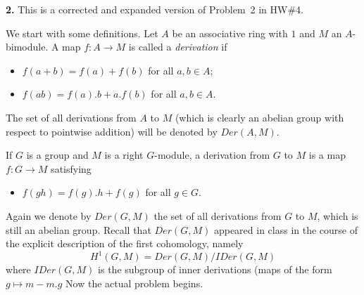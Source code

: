 \documentclass[12pt]{amsart}
\begin{document}
{\bf 2.} This is a corrected and expanded version of Problem~2 in HW\#4. 

We start with some definitions. Let $A$ be an associative ring with $1$ and $M$ an $A$-bimodule. A map $f:A\to M$ is called a {\it derivation} if
\begin{itemize}  
\item[(1)] $f(a+b)=f(a)+f(b)$ for all $a,b\in A$;
\item[(2)] $f(ab)=f(a).b+a.f(b)$ for all $a,b\in A$.
\end{itemize}
The set of all derivations from $A$ to $M$ (which is clearly an abelian group with respect to pointwise addition) will be denoted
by $Der(A,M)$.

If $G$ is a group and $M$ is a right $G$-module, a derivation from $G$ to $M$ is a map $f:G\to M$ satisfying 
\begin{itemize}  
\item[(3)] $f(gh)=f(g).h+f(g)$ for all $g\in G$.
\end{itemize}
Again we denote by $Der(G,M)$ the set of all derivations from $G$ to $M$, which is still an abelian group. 
Recall that $Der(G,M)$ appeared in class in the course of the explicit description of the first cohomology,
namely $$H^1(G,M)= Der(G,M)/IDer(G,M)$$ where $IDer(G,M)$ is the subgroup of inner derivations (maps of the form $g\mapsto m-m.g$
\skv
Now the actual problem begins.
\end{document}
